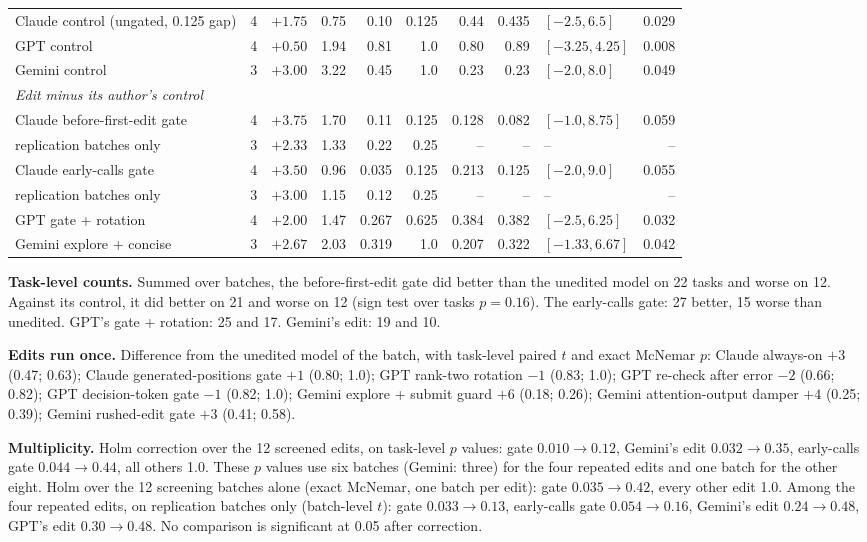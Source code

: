 \begin{table}[h]
{\begin{tabular}{lrrrrrrrlr}
Claude control (ungated, 0.125 gap) & 4 & $+1.75$ & 0.75 & 0.10 & 0.125 & 0.44 & 0.435 & $[-2.5, 6.5]$ & 0.029 \\
GPT control & 4 & $+0.50$ & 1.94 & 0.81 & 1.0 & 0.80 & 0.89 & $[-3.25, 4.25]$ & 0.008 \\
Gemini control & 3 & $+3.00$ & 3.22 & 0.45 & 1.0 & 0.23 & 0.23 & $[-2.0, 8.0]$ & 0.049 \\
\midrule
\multicolumn{10}{l}{\emph{Edit minus its author's control}} \\
Claude before-first-edit gate & 4 & $+3.75$ & 1.70 & 0.11 & 0.125 & 0.128 & 0.082 & $[-1.0, 8.75]$ & 0.059 \\
\quad replication batches only & 3 & $+2.33$ & 1.33 & 0.22 & 0.25 & -- & -- & -- & -- \\
Claude early-calls gate & 4 & $+3.50$ & 0.96 & 0.035 & 0.125 & 0.213 & 0.125 & $[-2.0, 9.0]$ & 0.055 \\
\quad replication batches only & 3 & $+3.00$ & 1.15 & 0.12 & 0.25 & -- & -- & -- & -- \\
GPT gate + rotation & 4 & $+2.00$ & 1.47 & 0.267 & 0.625 & 0.384 & 0.382 & $[-2.5, 6.25]$ & 0.032 \\
Gemini explore + concise & 3 & $+2.67$ & 2.03 & 0.319 & 1.0 & 0.207 & 0.322 & $[-1.33, 6.67]$ & 0.042 \\
\bottomrule
\end{tabular}}
\end{table}

\textbf{Task-level counts.} Summed over batches, the before-first-edit gate did better than the unedited model on 22 tasks and worse on 12. Against its control, it did better on 21 and worse on 12 (sign test over tasks $p = 0.16$). The early-calls gate: 27 better, 15 worse than unedited. GPT's gate + rotation: 25 and 17. Gemini's edit: 19 and 10.

\textbf{Edits run once.} Difference from the unedited model of the batch, with task-level paired $t$ and exact McNemar $p$: Claude always-on $+3$ (0.47; 0.63); Claude generated-positions gate $+1$ (0.80; 1.0); GPT rank-two rotation $-1$ (0.83; 1.0); GPT re-check after error $-2$ (0.66; 0.82); GPT decision-token gate $-1$ (0.82; 1.0); Gemini explore + submit guard $+6$ (0.18; 0.26); Gemini attention-output damper $+4$ (0.25; 0.39); Gemini rushed-edit gate $+3$ (0.41; 0.58).

\textbf{Multiplicity.} Holm correction over the 12 screened edits, on task-level $p$ values: gate $0.010 \rightarrow 0.12$, Gemini's edit $0.032 \rightarrow 0.35$, early-calls gate $0.044 \rightarrow 0.44$, all others 1.0. These $p$ values use six batches (Gemini: three) for the four repeated edits and one batch for the other eight. Holm over the 12 screening batches alone (exact McNemar, one batch per edit): gate $0.035 \rightarrow 0.42$, every other edit 1.0. Among the four repeated edits, on replication batches only (batch-level $t$): gate $0.033 \rightarrow 0.13$, early-calls gate $0.054 \rightarrow 0.16$, Gemini's edit $0.24 \rightarrow 0.48$, GPT's edit $0.30 \rightarrow 0.48$. No comparison is significant at 0.05 after correction.

